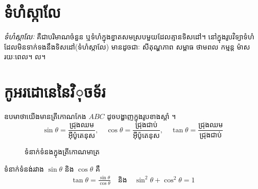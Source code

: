 \section{ទំហំស្កាលែ}
\begin{definition}
	\emph{\kml ទំហំស្កាលែៈ} គឺជាបរិមាណចំនួន ឬទំហំក្នុងខ្នាតសមស្របមួយដែលគ្មានទិសដៅ។ នៅក្នុងរូបវិទ្យាទំហំដែលមិនទាក់ទងនឹងទិសដៅ(ទំហំស្កាលែ) មានដូចជាៈ សីតុណ្ហភាព សម្ពាធ ថាមពល កម្មន្ត ម៉ាស រយៈពេល។ ល។
\end{definition}
\section{កូអរដោនេនៃវិុចទ័រ}
	\begin{multicols}{2}
		ឧបមាថាយើងមានត្រីកោណកែង $ABC$ ដូចបង្ហាញក្នុងរូបខាងស្តាំ ។
		\begin{equation*}
			\sin\theta=\frac{\text{ជ្រុងឈម}}{\text{អុីប៉ូតេនុស}},\quad \cos\theta=\frac{\text{ជ្រុងជាប់}}{\text{អុីប៉ូតេនុស}},\quad \tan\theta=\frac{\text{ជ្រុងឈម}}{\text{ជ្រុងជាប់}}
		\end{equation*}
		\begin{figure}[H]
			\centering
			\caption{\koc ទំនាក់ទំនងក្នុងត្រីកោណមាត្រ}
		\end{figure}
	\end{multicols}
	ទំនាក់ទំនង់រវាង $\sin\theta$ និង $\cos\theta$ គឺ
	\begin{align*}
		\tan\theta=\frac{\sin\theta}{\cos\theta} \quad \text{និង}\quad \sin^{2}\theta+\cos^{2}\theta=1
	\end{align*}
